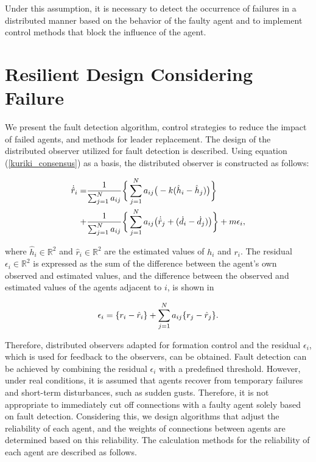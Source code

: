 \documentclass[a4paper,fleqn,10pt,twocolumn]{SICE_ISCS}
\begin{document}
Under this assumption, it is necessary to detect the occurrence of failures in a distributed manner based on the behavior of the faulty agent and to implement control methods that block the influence of the agent.


\section{Resilient Design Considering Failure}
We present the fault detection algorithm, control strategies to reduce the impact of failed agents, and  methods for leader replacement.
The design of the distributed observer utilized for fault detection is described. Using equation (\ref{kuriki_consensus}) as a basis, the distributed observer is constructed as follows:

\begin{small}
\begin{align}
	\dot{\hat{r}}_i=&\frac{1}{\sum_{j=1}^{N}a_{ij}}
	\bigg\{\sum_{j=1}^{N}a_{ij}\big(-k(\hat{h}_i - \hat{h}_j)\big)\bigg\} \notag\\
	+&	\frac{1}{\sum_{j=1}^{N}a_{ij}}
	\bigg\{\sum_{j=1}^{N}a_{ij}\big(\dot{\hat{r}}_j+(\dot{d}_i-\dot{d}_j)\big)\bigg\} +m\epsilon_i,
\end{align}
\end{small}

\noindent where $\hat{h}_i\in{\mathbb{R}}^2$ and $\hat{r}_i\in{\mathbb{R}}^2$ are the estimated values of $h_i$ and $r_i$.
The residual $\epsilon_i\in{\mathbb{R}}^2$ is expressed as the sum of the difference between the agent's own observed and estimated values, and the difference between the observed and estimated values of the agents adjacent to $i$, is shown in

\begin{align}
	\epsilon_i =\{r_i-\hat{r}_i\}+\sum_{j=1}^{N}a_{ij}\{r_j-\hat{r}_j\}.	
	\vspace{-3mm}
\end{align}

Therefore, distributed observers adapted for formation control and the residual $\epsilon_i$, which is used for feedback to the observers, can be obtained.
Fault detection can be achieved by combining the residual $\epsilon_i$ with a predefined threshold. 
However, under real conditions, it is assumed that agents recover from temporary failures and short-term disturbances, such as sudden gusts. Therefore, it is not appropriate to immediately cut off connections with a faulty agent solely based on fault detection. Considering this, we design algorithms that adjust the reliability of each agent, and the weights of connections between agents are determined based on this reliability.
The calculation methods for the reliability of each agent are described as follows.
\end{document}
